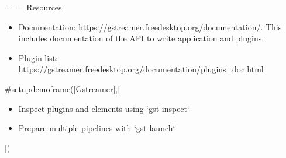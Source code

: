 === {Resources}
  \begin{itemize}
  \item Documentation:
    \url{https://gstreamer.freedesktop.org/documentation/}. This
    includes documentation of the API to write application and
    plugins.
  \item Plugin list:
    \url{https://gstreamer.freedesktop.org/documentation/plugins_doc.html}
  \end{itemize}


#setupdemoframe([Gstreamer],[
  \begin{itemize}
  \item Inspect plugins and elements using `gst-inspect`
  \item Prepare multiple pipelines with `gst-launch`
  \end{itemize}
])
